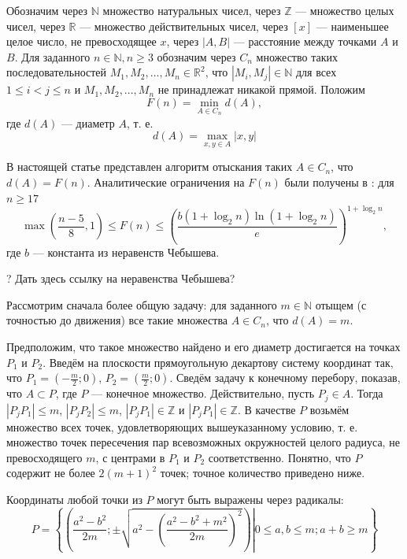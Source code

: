\documentclass{article}
\begin{document}

Обозначим через $\mathbb{N}$ множество натуральных чисел, через $\mathbb{Z}$ --- множество целых чисел, через $\mathbb{R}$ --- множество действительных чисел, через $[x]$ --- наименьшее целое число, не превосходящее $x$, через $|A,B|$ --- расстояние между точками $A$ и $B$.
Для заданного $n\in \mathbb{N}, n\geq 3$ обозначим через $C_n$ множество таких последовательностей $M_1,M_2,...,M_n \in \mathbb{R}^2$, что $|M_i,M_j|\in\mathbb{N}$ для всех $1\leq i < j  \leq n$ и  $M_1,M_2,...,M_n$ не принадлежат никакой прямой.
Положим
$$
F(n)=\min\limits_{A\in C_n} d(A),
$$
где $d(A)$ --- диаметр $A$, т. е.
$$
d(A)=\max\limits_{x,y\in A}|x,y|
$$

В настоящей статье представлен алгоритм отыскания таких $A \in C_n$, что $d(A) = F(n)$.
Аналитические ограничения на $F(n)$ были получены в \cite{nashaStatya}:
для $n \geq 17$
	$$
		\max\left( \frac{n-5}{8}, 1 \right) \leq F(n) \leq \left( \frac{b (1+\log_2 n )\ln (1 + \log_2 n)}{e}\right)^{1+\log_2 n},
	$$
где $b$ --- константа из неравенств Чебышева.

? Дать здесь ссылку на неравенства Чебышева?




Рассмотрим сначала более общую задачу: для заданного $m \in \mathbb{N}$ отыщем (с точностью до движения) все такие множества $A \in C_n$, что $d(A) = m$.

Предположим, что такое множество найдено и его диаметр достигается на точках $P_1$ и $P_2$.
Введём на плоскости прямоугольную декартову систему координат так, что $P_1 = \left(-\frac{m}{2}; 0 \right)$, $P_2 = \left(\frac{m}{2}; 0\right)$.
Сведём задачу к конечному перебору, показав, что $A \subset P$, где $P$ --- конечное множество.
Действительно, пусть $P_{j} \in A$.
Тогда $|P_{j} P_1| \leq m$, $|P_{j} P_2| \leq m$, $|P_{j} P_1| \in \mathbb{Z}$ и $|P_{j} P_1| \in \mathbb{Z}$.
В качестве $P$ возьмём множество всех точек, удовлетворяющих вышеуказанному условию, т. е. множество точек пересечения пар всевозможных окружностей целого радиуса, не превосходящего $m$, с центрами в $P_1$ и $P_2$ соответственно.
Понятно, что $P$ содержит не более $2(m+1)^2$ точек; точное количество приведено ниже.

Координаты любой точки из $P$ могут быть выражены через радикалы:
$$
	P = \left\{
		\left(\left.  \frac{a^2-b^2}{2m} ; \pm\sqrt{a^2  - \left( \frac{a^2-b^2+m^2}{2m}\right)^2}  \right)	\right| 0 \leq a, b \leq m ; a+b \geq m
	\right\}
$$
\end{document}
